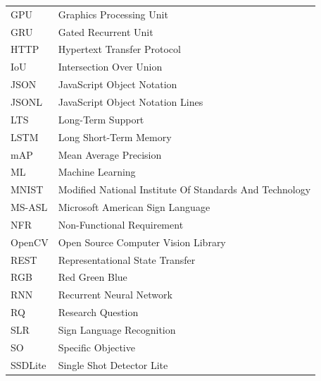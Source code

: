 \begin{longtable}{@{}p{3.0cm}p{10.5cm}@{}}
        GPU              & Graphics Processing Unit                                \\
        GRU              & Gated Recurrent Unit                                    \\
        HTTP             & Hypertext Transfer Protocol                             \\
        IoU              & Intersection Over Union                                 \\
        JSON             & JavaScript Object Notation                              \\
        JSONL            & JavaScript Object Notation Lines                        \\
        LTS              & Long-Term Support                                       \\
        LSTM             & Long Short-Term Memory                                  \\
        mAP              & Mean Average Precision                                  \\
        ML               & Machine Learning                                        \\
        MNIST            & Modified National Institute Of Standards And Technology \\
        MS-ASL           & Microsoft American Sign Language                        \\
        NFR              & Non-Functional Requirement                              \\
        OpenCV           & Open Source Computer Vision Library                     \\
        REST             & Representational State Transfer                         \\
        RGB              & Red Green Blue                                          \\
        RNN              & Recurrent Neural Network                                \\
        RQ               & Research Question                                       \\
        SLR              & Sign Language Recognition                               \\
        SO               & Specific Objective                                      \\
        SSDLite          & Single Shot Detector Lite                               \\

\end{longtable}
